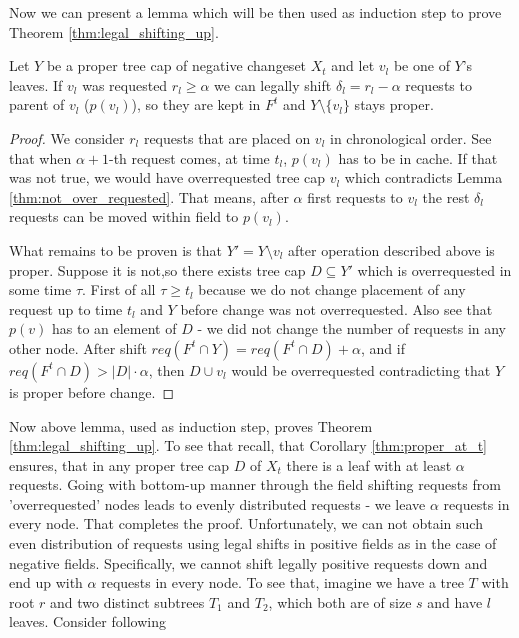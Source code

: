 Now we can present a lemma which will be then used as induction step to prove 
Theorem \ref{thm:legal_shifting_up}.
\begin{lemma}
Let $Y$ be a proper tree cap of negative changeset $X_t$ and let $v_l$ be one 
of $Y$'s leaves. If $v_l$ was requested $r_l \geq \alpha$ we can legally shift  
$\delta_l = r_l - \alpha$ requests to parent of $v_l$ ($p(v_l)$), so they are 
kept in $F^t$ and $Y \setminus \{v_l\}$ stays proper. 
\end{lemma}
\begin{proof}
We consider $r_l$ requests that are placed on $v_l$ in chronological order. See 
that when $\alpha + 1$-th request comes, at time $t_l$, $p(v_l)$ has to be in 
cache. If that was not true, we would have overrequested tree cap 
${v_l}$ which 
contradicts Lemma \ref{thm:not_over_requested}. That means, after $\alpha$ first 
requests to $v_l$ the rest $\delta_l$ requests can be moved within field to 
$p(v_l)$.

What remains to be proven is that $Y' = Y \setminus {v_l}$ after
operation described above
is proper. Suppose it is not,so there exists tree cap $D \subseteq Y'$ which 
is overrequested in some time $\tau$. First of all $\tau \geq t_l$ because we 
do not change placement of any request up to time $t_l$ and $Y$ before change 
was not overrequested. Also see that $p(v)$ has to an element of $D$ - we 
did not change the 
number of requests in any other node. After shift $req(F^t \cap Y) = req(F^t 
\cap D) + \alpha$, and if $req(F^t \cap D) > |D| \cdot \alpha$, then $D \cup 
v_l$ would be overrequested contradicting that $Y$ is proper before change.
\end{proof}
Now above lemma, used as induction step, proves Theorem 
\ref{thm:legal_shifting_up}. To see that recall, that 
Corollary \ref{thm:proper_at_t} ensures, that in any proper tree cap $D$ of 
$X_t$ there is a leaf with at least $\alpha$ requests. Going with bottom-up 
manner through the field shifting requests from 'overrequested' nodes leads to 
evenly distributed requests - we leave $\alpha$ requests in every node. That 
completes the proof.   
Unfortunately, we can not obtain such even distribution of requests using legal 
shifts in positive fields as in the case of negative fields. Specifically, we 
cannot 
shift legally positive requests down and end up with $\alpha$ requests in every 
node. To see that, imagine we have a tree $T$ with root $r$ and two distinct 
subtrees $T_1$ 
and $T_2$, which both are of size $s$ and have $l$ leaves. Consider following 
